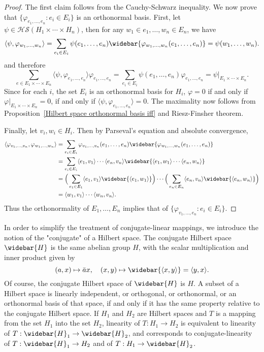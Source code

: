 \begin{proof}
The first claim follows from the Cauchy-Schwarz inequality. We now prove that $\{\varphi_{e_1,\dots,e_n}:e_i\in E_i\}$ is an orthonormal basis. First, let $\psi\in\mathcal{HS}(H_1\times\cdots\times H_n)$, then for any $w_1\in e_1,\dots,w_n\in E_n$, we have
\[\langle\psi,\varphi_{w_1,\dots,w_n}\rangle=\sum_{e_i\in E_i}\psi(e_1,\dots,e_n)\widebar{\varphi_{w_1,\dots,w_n}(e_1,\dots,e_n)}=\psi(w_1,\dots,w_n).\]
and therefore
\[\sum_{e\in E_1\times\cdots\times E_n}\langle\psi,\varphi_{e_1,\dots,e_n}\rangle\varphi_{e_1,\dots,e_n}=\sum_{e_i\in E_i}\psi(e_1,\dots,e_n)\varphi_{e_1,\dots,e_n}=\psi|_{E_1\times\cdots\times E_n}.\]
Since for each $i$, the set $E_i$ is an orthonormal basis for $H_i$, $\varphi=0$ if and only if $\varphi|_{E_1\times\cdots\times E_n}=0$, if and only if $\langle\psi,\varphi_{e_1,\dots,e_n}\rangle=0$. The maximality now follows from Proposition~\ref{Hilbert space orthonormal basis iff} and Riesz-Finsher theorem.\par
Finally, let $v_i,w_i\in H_i$. Then by Parseval's equation and absolute convergence,
\begin{equation*}
\begin{aligned}
\langle\varphi_{v_1,\dots,v_n},\varphi_{w_1,\dots,w_n}\rangle&=\sum_{e_i\in E_i}\varphi_{v_1,\dots,v_n}(e_1,\dots,e_n)\widebar{\varphi_{w_1,\dots,w_n}(e_1,\dots,e_n)}\\
&=\sum_{e_i\in E_i}\langle e_1,v_1\rangle\cdots\langle e_n,v_n\rangle\widebar{\langle e_1,w_1\rangle\cdots\langle e_n,w_n\rangle}\\
&=\Big(\sum_{e_1\in E_1}\langle e_1,v_1\rangle\widebar{\langle e_1,w_1\rangle}\Big)\cdots\Big(\sum_{e_n\in E_n}\langle e_n,v_n\rangle\widebar{\langle e_n,w_n\rangle}\Big)\\
&=\langle w_1,v_1\rangle\cdots\langle w_n,v_n\rangle.
\end{aligned}
\end{equation*}
Thus the orthonormality of $E_1,\dots,E_n$ implies that of $\{\varphi_{v_1,\dots,e_n}:e_i\in E_i\}$.
\end{proof}
In order to simplify the treatment of conjugate-linear mappings, we introduce the notion of the "conjugate" of a Hilbert space. The conjugate Hilbert space $\widebar{H}$ is the same abelian group $H$, with the scalar multiplication and inner product given by
\[(a,x)\mapsto\bar{a}x,\quad (x,y)\mapsto\widebar{\langle x,y\rangle}=\langle y,x\rangle.\]
Of course, the conjugate Hilbert space of $\widebar{H}$ is $H$. A subset of a Hilbert space is linearly independent, or orthogonal, or orthonormal, or an orthonormal basis of that space, if and only if it has the same property relative to the conjugate Hilbert space. If $H_1$ and $H_2$ are Hilbert spaces and $T$ is a mapping from the set $H_1$ into the set $H_2$, linearity of $T:H_1\to H_2$ is equivalent to linearity of $T:\widebar{H}_1\to\widebar{H}_2$, and corresponds to conjugate-linearity of $T:\widebar{H}_1\to H_2$ and of $T:H_1\to\widebar{H}_2$.\par
